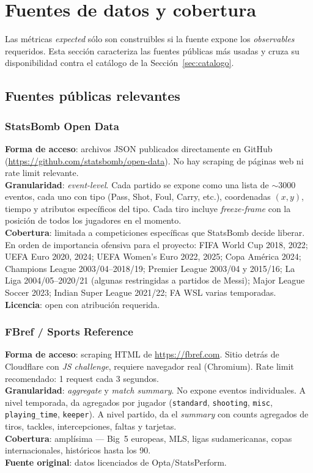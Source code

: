 \section{Fuentes de datos y cobertura}
\label{sec:fuentes}

Las métricas \emph{expected} sólo son construibles si la fuente expone los \emph{observables} requeridos. Esta sección caracteriza las fuentes públicas más usadas y cruza su disponibilidad contra el catálogo de la Sección~\ref{sec:catalogo}.

\subsection{Fuentes públicas relevantes}

\subsubsection{StatsBomb Open Data}

\textbf{Forma de acceso}: archivos JSON publicados directamente en GitHub (\url{https://github.com/statsbomb/open-data}). No hay scraping de páginas web ni rate limit relevante.\\
\textbf{Granularidad}: \emph{event-level}. Cada partido se expone como una lista de $\sim 3000$ eventos, cada uno con tipo (Pass, Shot, Foul, Carry, etc.), coordenadas $(x,y)$, tiempo y atributos específicos del tipo. Cada tiro incluye \emph{freeze-frame} con la posición de todos los jugadores en el momento.\\
\textbf{Cobertura}: limitada a competiciones específicas que StatsBomb decide liberar. En orden de importancia ofensiva para el proyecto: FIFA World Cup 2018, 2022; UEFA Euro 2020, 2024; UEFA Women's Euro 2022, 2025; Copa América 2024; Champions League 2003/04--2018/19; Premier League 2003/04 y 2015/16; La Liga 2004/05--2020/21 (algunas restringidas a partidos de Messi); Major League Soccer 2023; Indian Super League 2021/22; FA WSL varias temporadas.\\
\textbf{Licencia}: open con atribución requerida.

\subsubsection{FBref / Sports Reference}

\textbf{Forma de acceso}: scraping HTML de \url{https://fbref.com}. Sitio detrás de Cloudflare con \emph{JS challenge}, requiere navegador real (Chromium). Rate limit recomendado: 1 request cada 3 segundos.\\
\textbf{Granularidad}: \emph{aggregate} y \emph{match summary}. No expone eventos individuales. A nivel temporada, da agregados por jugador (\texttt{standard}, \texttt{shooting}, \texttt{misc}, \texttt{playing\_time}, \texttt{keeper}). A nivel partido, da el \emph{summary} con counts agregados de tiros, tackles, intercepciones, faltas y tarjetas.\\
\textbf{Cobertura}: amplísima --- Big~5 europeas, MLS, ligas sudamericanas, copas internacionales, históricos hasta los 90.\\
\textbf{Fuente original}: datos licenciados de Opta/StatsPerform.

